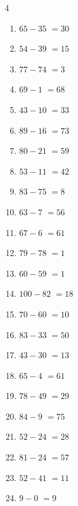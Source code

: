 \begin{multicols}{4}
\begin{enumerate}
  \item $65-35$
        $=30$

  \item $54-39$
        $=15$

  \item $77-74$
        $=3$

  \item $69-1$
        $=68$

  \item $43-10$
        $=33$

  \item $89-16$
        $=73$

  \item $80-21$
        $=59$

  \item $53-11$
        $=42$

  \item $83-75$
        $=8$

  \item $63-7$
        $=56$

  \item $67-6$
        $=61$

  \item $79-78$
        $=1$

  \item $60-59$
        $=1$

  \item $100-82$
        $=18$

  \item $70-60$
        $=10$

  \item $83-33$
        $=50$

  \item $43-30$
        $=13$

  \item $65-4$
        $=61$

  \item $78-49$
        $=29$

  \item $84-9$
        $=75$

  \item $52-24$
        $=28$

  \item $81-24$
        $=57$

  \item $52-41$
        $=11$

  \item $9-0$
        $=9$


\end{enumerate}
\end{multicols}
